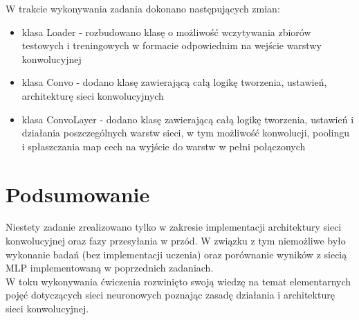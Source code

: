 \documentclass[17pt]{article}
\begin{document}
W trakcie wykonywania zadania dokonano następujących zmian:
\begin{itemize}
\item klasa Loader - rozbudowano klasę o możliwość wczytywania zbiorów testowych i treningowych w formacie odpowiednim na wejście warstwy konwolucyjnej
\item klasa Convo - dodano klasę zawierającą całą logikę tworzenia, ustawień, architekturę sieci konwolucyjnych
\item klasa ConvoLayer - dodano klasę zawierającą całą logikę tworzenia, ustawień i działania poszczególnych warstw sieci, w tym możliwość konwolucji, poolingu i spłaszczania map cech na wyjście do warstw w pełni połączonych
\end{itemize}

\newpage

\section{Podsumowanie}
\vspace{4mm}

Niestety zadanie zrealizowano tylko w zakresie implementacji architektury sieci konwolucyjnej oraz fazy przesyłania w przód. W związku z tym niemożliwe było wykonanie badań (bez implementacji uczenia) oraz porównanie wyników z siecią MLP implementowaną w poprzednich zadaniach.\\

W toku wykonywania ćwiczenia rozwinięto swoją wiedzę na temat elementarnych pojęć dotyczących sieci neuronowych poznając zasadę działania i architekturę sieci konwolucyjnej.
\end{document}

